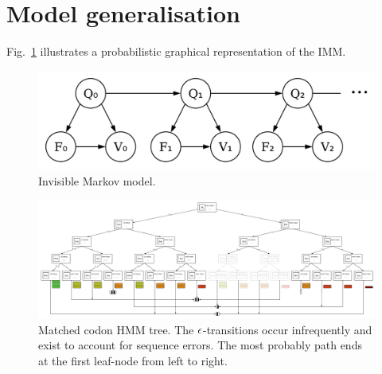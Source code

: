 \section{Model generalisation}

Fig.~\ref{fig:imm} illustrates a probabilistic graphical representation of the IMM.\@

\begin{figure}[htbp]
\centering
\includegraphics[width=.45\linewidth]{figure/imm}
\caption{Invisible Markov model.}%
\label{fig:imm}
\end{figure}

\newpage
\newpage

\begin{figure}
    \centering
    \includegraphics[scale=0.9]{figure/codon-hmm-tree}
    \caption{Matched codon HMM tree.
        The $\epsilon$-transitions occur infrequently and exist to account for sequence errors.
        The most probably path ends at the first leaf-node from left to right.}\label{fig:codon-hmm-tree}
\end{figure}

